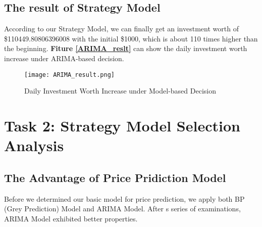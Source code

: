 \documentclass{mcmthesis}
\begin{document}
\subsection{The result of Strategy Model}
According to our Strategy Model, we can finally get an investment worth of \$110449.80806396008 with the initial \$1000, which is about 110 times higher than the beginning. \textbf{Fiture \ref{ARIMA_reslt}} can show the daily investment worth increase under ARIMA-based decision.

\begin {figure} [htbp]
\centering
\texttt{[image: ARIMA\_result.png]}
\caption{Daily Investment Worth Increase under Model-based Decision}
\end {figure}


\section{Task 2: Strategy Model Selection Analysis}

\subsection{The Advantage of Price Pridiction Model}
\par Before we determined our basic model for price prediction, we apply both BP (Grey Prediction) Model and ARIMA Model. After s series of examinations, ARIMA Model exhibited better properties.
\end{document}
